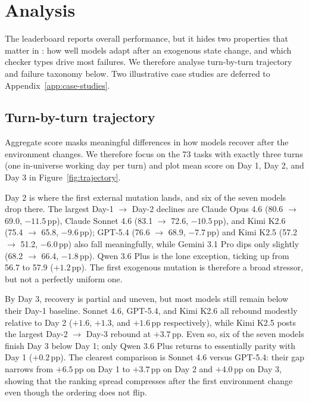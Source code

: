 
\section{Analysis}
\label{sec:analysis}

The leaderboard reports overall performance, but it hides two properties that matter in \bench{}: how well models adapt after an exogenous state change, and which checker types drive most failures. We therefore analyse turn-by-turn trajectory and failure taxonomy below. Two illustrative case studies are deferred to Appendix~\ref{app:case-studies}.

\subsection{Turn-by-turn trajectory}
\label{sec:exp-trajectory}

Aggregate score masks meaningful differences in how models recover after the environment changes. We therefore focus on the 73 tasks with exactly three turns (one in-universe working day per turn) and plot mean score on Day 1, Day 2, and Day 3 in Figure~\ref{fig:trajectory}.



Day 2 is where the first external mutation lands, and six of the seven models drop there. The largest Day-1 $\to$ Day-2 declines are Claude Opus 4.6 (80.6 $\to$ 69.0, $-11.5$\,pp), Claude Sonnet 4.6 (83.1 $\to$ 72.6, $-10.5$\,pp), and Kimi K2.6 (75.4 $\to$ 65.8, $-9.6$\,pp); GPT-5.4 (76.6 $\to$ 68.9, $-7.7$\,pp) and Kimi K2.5 (57.2 $\to$ 51.2, $-6.0$\,pp) also fall meaningfully, while Gemini 3.1 Pro dips only slightly (68.2 $\to$ 66.4, $-1.8$\,pp). Qwen 3.6 Plus is the lone exception, ticking up from 56.7 to 57.9 ($+1.2$\,pp). The first exogenous mutation is therefore a broad stressor, but not a perfectly uniform one.

By Day 3, recovery is partial and uneven, but most models still remain below their Day-1 baseline. Sonnet 4.6, GPT-5.4, and Kimi K2.6 all rebound modestly relative to Day 2 ($+1.6$, $+1.3$, and $+1.6$\,pp respectively), while Kimi K2.5 posts the largest Day-2 $\to$ Day-3 rebound at $+3.7$\,pp. Even so, six of the seven models finish Day 3 below Day 1; only Qwen 3.6 Plus returns to essentially parity with Day 1 ($+0.2$\,pp). The clearest comparison is Sonnet 4.6 versus GPT-5.4: their gap narrows from $+6.5$\,pp on Day 1 to $+3.7$\,pp on Day 2 and $+4.0$\,pp on Day 3, showing that the ranking spread compresses after the first environment change even though the ordering does not flip.

